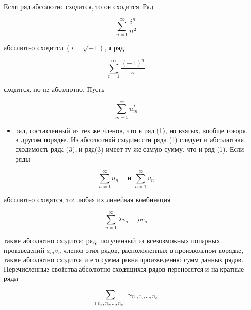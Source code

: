 \documentclass[10pt]{article}
\begin{document}
Если ряд абсолютно сходится, то он сходится. Ряд



\[

\sum_{n=1}^{\infty} \frac{i^{n}}{n^{2}}

\]



абсолютно сходитсл $(i=\sqrt{-1})$, а ряд



\[

\sum_{n=1}^{\infty} \frac{(-1)^{n}}{n}

\]



сходится, но не абсолютно. Пусть



\[

\sum_{m=1}^{\infty} u_{m}^{*}

\]



\begin{itemize}

  \item ряд, составленный из тех же членов, что и ряд (1), но взятых, вообще говоря, в другом порядке. Из абсолютной сходимости ряда (1) следует и абсолютная сходимость ряда (3), и ряд(3) имеет ту же самую сумму, что и ряд (1). Если ряды

\end{itemize}



\[

\sum_{n=1}^{\infty} u_{n} \quad \text { и } \sum_{n=1}^{\infty} v_{n}

\]



абсолютно сходятся, то: любая их линейная комбинация



\[

\sum_{n=1}^{\infty} \lambda u_{n}+\mu v_{n}

\]



также абсолютно сходится; ряд, полученный из всевозможных попарных произведений $u_{m} v_{n}$ членов этих рядов, расположенных в произвольном порядке, также абсолютно сходится и его сумма равна произведению сумм данных рядов. Перечисленные свойства абсолютно сходящихся рядов переносятся и на кратные ряды



\[

\sum_{\left(n_{1}, n_{2}, \ldots, n_{k}\right)} u_{n_{1}, n_{2}, \ldots, n_{k}} .

\]
\end{document}
